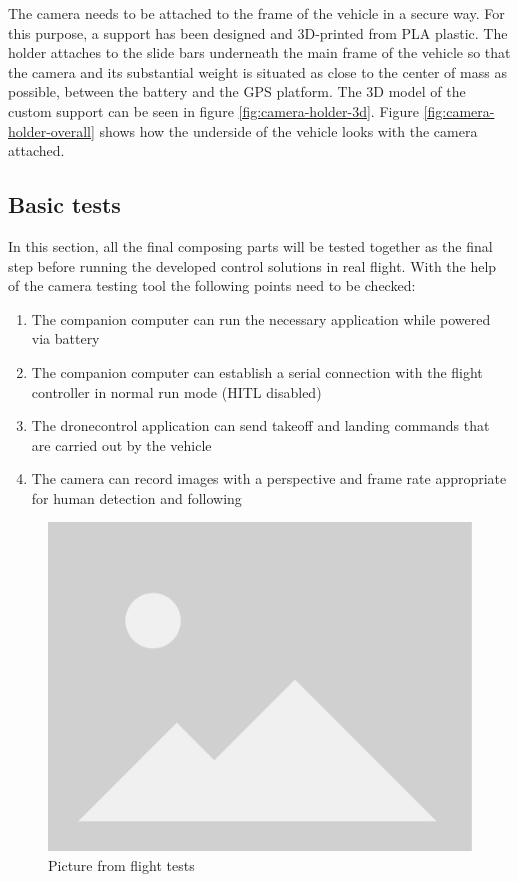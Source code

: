 The camera needs to be attached to the frame of the vehicle in a secure way.
For this purpose, a support has been designed and 3D-printed from PLA plastic.
The holder attaches to the slide bars underneath the main frame of the vehicle so that the camera and its substantial weight is situated as close to the center of mass as possible, between the battery and the GPS platform.
The 3D model of the custom support can be seen in figure \ref{fig:camera-holder-3d}.
Figure \ref{fig:camera-holder-overall} shows how the underside of the vehicle looks with the camera attached.

\subsection{Basic tests}
\label{sec:test-8-flight}


In this section, all the final composing parts will be tested together as the final step before running the developed control solutions in real flight.
With the help of the camera testing tool the following points need to be checked:
\begin{enumerate}
    \item The companion computer can run the necessary application while powered via battery
    \item The companion computer can establish a serial connection with the flight controller in normal run mode (HITL disabled)
    \item The dronecontrol application can send takeoff and landing commands that are carried out by the vehicle
    \item The camera can record images with a perspective and frame rate appropriate for human detection and following
\end{enumerate}

\begin{figure}
  \centering
  \includegraphics[width=.6\textwidth, keepaspectratio]{img/placeholder.png}
  \caption{Picture from flight tests}\label{fig:flight-test-basic}
\end{figure}

